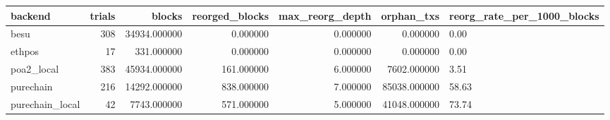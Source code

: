 \begin{tabular}{lrrrrrl}
\toprule
backend & trials & blocks & reorged\_blocks & max\_reorg\_depth & orphan\_txs & reorg\_rate\_per\_1000\_blocks \\
\midrule
besu & 308 & 34934.000000 & 0.000000 & 0.000000 & 0.000000 & 0.00 \\
ethpos & 17 & 331.000000 & 0.000000 & 0.000000 & 0.000000 & 0.00 \\
poa2\_local & 383 & 45934.000000 & 161.000000 & 6.000000 & 7602.000000 & 3.51 \\
purechain & 216 & 14292.000000 & 838.000000 & 7.000000 & 85038.000000 & 58.63 \\
purechain\_local & 42 & 7743.000000 & 571.000000 & 5.000000 & 41048.000000 & 73.74 \\
\bottomrule
\end{tabular}
